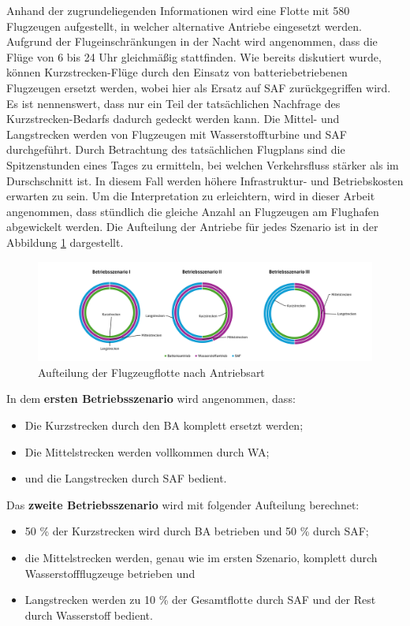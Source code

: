 Anhand der zugrundeliegenden Informationen wird eine Flotte mit 580 Flugzeugen aufgestellt, in welcher alternative Antriebe eingesetzt werden.
Aufgrund der Flugeinschränkungen in der Nacht wird angenommen, dass die Flüge von 6 bis 24 Uhr gleichmäßig stattfinden. 
Wie bereits diskutiert wurde, können Kurzstrecken-Flüge durch den Einsatz von batteriebetriebenen Flugzeugen ersetzt werden, 
wobei hier als Ersatz auf SAF zurückgegriffen wird. Es ist nennenswert, dass nur ein Teil der tatsächlichen Nachfrage des Kurzstrecken-Bedarfs 
dadurch gedeckt werden kann. Die Mittel- und Langstrecken werden von Flugzeugen mit Wasserstoffturbine und SAF durchgeführt.
%
Durch Betrachtung des tatsächlichen Flugplans sind die Spitzenstunden eines Tages zu ermitteln, bei welchen Verkehrsfluss stärker als im Durschschnitt ist.
In diesem Fall werden höhere Infrastruktur- und Betriebskosten erwarten zu sein.
Um die Interpretation zu erleichtern, wird in dieser Arbeit angenommen, dass stündlich die gleiche Anzahl an Flugzeugen 
am Flughafen abgewickelt werden. 
%
Die Aufteilung der Antriebe für jedes Szenario ist in der Abbildung \ref{betriebsszenarien} dargestellt.
%
\begin{figure}[h]
	\centering
	\includegraphics[width=1.0\linewidth]{Bilder/Betriebsszenarien.png}
	\caption[Betriebsszenarien]{Aufteilung der Flugzeugflotte nach Antriebsart}
	\label{betriebsszenarien}
\end{figure}
%
In dem \textbf{ersten Betriebsszenario} wird angenommen, dass:
\begin{itemize}
    \item Die Kurzstrecken durch den BA komplett ersetzt werden;
    \item Die Mittelstrecken werden vollkommen durch WA;
    \item und die Langstrecken durch SAF bedient.
\end{itemize}
Das \textbf{zweite Betriebsszenario} wird mit folgender Aufteilung berechnet:
\begin{itemize}
    \item 50 \% der Kurzstrecken wird durch BA betrieben und 50 \% durch SAF; 
    \item die Mittelstrecken werden, genau wie im ersten Szenario, komplett durch Wasserstoffflugzeuge betrieben und 
    \item Langstrecken werden zu 10 \% der Gesamtflotte durch SAF und der Rest durch Wasserstoff bedient.
\end{itemize}
